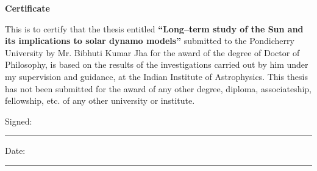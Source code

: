 \noindent
\vspace{2.5cm}
\newpage
\begin{center}{\huge\bf Certificate}\end{center}
\thispagestyle{empty}
This is to certify that the thesis entitled \textbf {``Long--term study of the Sun and its implications to solar dynamo models''} submitted to the Pondicherry University by Mr. Bibhuti Kumar Jha for the award of the degree of Doctor of Philosophy, is based on the results of the investigations carried out by him under my supervision and guidance, at the Indian Institute of Astrophysics. This thesis has not been submitted for the award of any other degree, diploma, associateship, fellowship, etc. of any other university or institute.

Signed:\\
\rule[1em]{25em}{1.0pt}  %
 
Date:\\
\rule[1em]{25em}{1.0pt}  %

\clearpage
